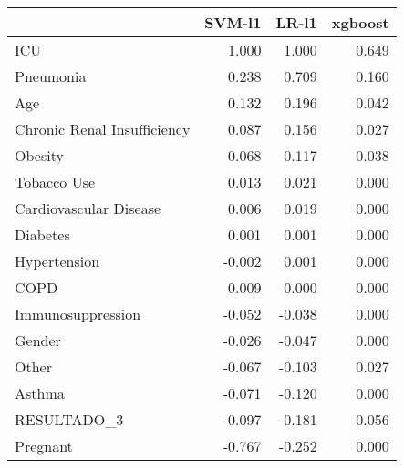 \begin{tabular}{lrrr}
\toprule
{} &  SVM-l1 &  LR-l1 &  xgboost \\
\midrule
ICU                         &   1.000 &  1.000 &    0.649 \\
Pneumonia                   &   0.238 &  0.709 &    0.160 \\
Age                         &   0.132 &  0.196 &    0.042 \\
Chronic Renal Insufficiency &   0.087 &  0.156 &    0.027 \\
Obesity                     &   0.068 &  0.117 &    0.038 \\
Tobacco Use                 &   0.013 &  0.021 &    0.000 \\
Cardiovascular Disease      &   0.006 &  0.019 &    0.000 \\
Diabetes                    &   0.001 &  0.001 &    0.000 \\
Hypertension                &  -0.002 &  0.001 &    0.000 \\
COPD                        &   0.009 &  0.000 &    0.000 \\
Immunosuppression           &  -0.052 & -0.038 &    0.000 \\
Gender                      &  -0.026 & -0.047 &    0.000 \\
Other                       &  -0.067 & -0.103 &    0.027 \\
Asthma                      &  -0.071 & -0.120 &    0.000 \\
RESULTADO\_3                 &  -0.097 & -0.181 &    0.056 \\
Pregnant                    &  -0.767 & -0.252 &    0.000 \\
\bottomrule
\end{tabular}
